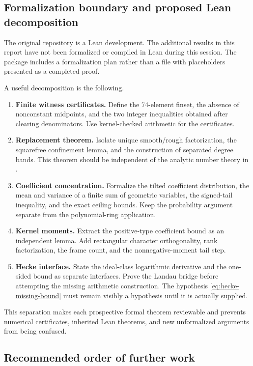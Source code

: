 \subsection{Formalization boundary and proposed Lean decomposition}

The original repository is a Lean development. The additional results
in this report have not been formalized or compiled in Lean during this
session. The package includes a formalization plan rather than a file
with placeholders presented as a completed proof.

A useful decomposition is the following.

\begin{enumerate}
\item \textbf{Finite witness certificates.} Define the 74-element finset,
the absence of nonconstant midpoints, and the two integer inequalities
obtained after clearing denominators. Use kernel-checked arithmetic for
the certificates.
\item \textbf{Replacement theorem.} Isolate unique smooth/rough
factorization, the squarefree confinement lemma, and the construction
of separated degree bands. This theorem should be independent of the
analytic number theory in .
\item \textbf{Coefficient concentration.} Formalize the tilted
coefficient distribution, the mean and variance of a finite sum of
geometric variables, the signed-tail inequality, and the exact
ceiling bounds. Keep the probability argument separate from the
polynomial-ring application.
\item \textbf{Kernel moments.} Extract the positive-type coefficient
bound as an independent lemma. Add rectangular character
orthogonality, rank factorization, the frame count, and the
nonnegative-moment tail step.
\item \textbf{Hecke interface.} State the ideal-class logarithmic
derivative and the one-sided bound as separate interfaces. Prove the
Landau bridge before attempting the missing arithmetic construction.
The hypothesis \eqref{eq:hecke-missing-bound} must remain visibly a
hypothesis until it is actually supplied.
\end{enumerate}

This separation makes each prospective formal theorem reviewable and
prevents numerical certificates, inherited Lean theorems, and new
unformalized arguments from being confused.

\subsection{Recommended order of further work}

